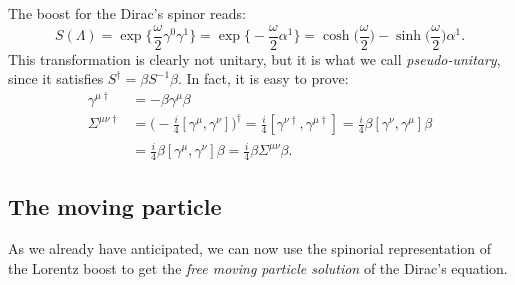 The boost for the Dirac's spinor reads:
\begin{equation*}
    S(\Lambda)=\exp\bigg\{\frac{\omega}{2}\gamma^0\gamma^1\bigg\}=\exp\bigg\{-\frac{\omega}{2}\alpha^1\bigg\}=\cosh\bigg(\frac{\omega}{2}\bigg)-\sinh\bigg(\frac{\omega}{2}\bigg)\alpha^1.
\end{equation*}
This transformation is clearly not unitary, but it is what we call \emph{pseudo-unitary}, since it satisfies $S^{\dagger}=\beta S^{-1}\beta$.
In fact, it is easy to prove:
\begin{align*}
    \gamma^{\mu\dagger}&=-\beta\gamma^\mu\beta\\
    \Sigma^{\mu\nu\dagger}&=\bigg(-\frac{i}{4}[\gamma^\mu,\gamma^\nu]\bigg)^\dagger=\frac{i}{4}[\gamma^{\nu\dagger},\gamma^{\mu\dagger}]=\frac{i}{4}\beta[\gamma^{\nu},\gamma^{\mu}]\beta\\&=\frac{i}{4}\beta[\gamma^{\mu},\gamma^{\nu}]\beta=\frac{i}{4}\beta\Sigma^{\mu\nu}\beta.
\end{align*}
\subsection{The moving particle}
As we already have anticipated, we can now use the spinorial representation of the Lorentz boost to get the \emph{free moving particle solution} of the Dirac's equation.\\

